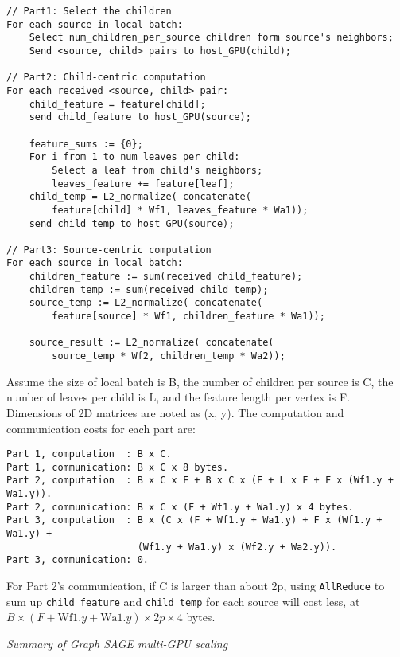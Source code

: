 \documentclass[10pt,oneside]{memoir}
\begin{document}
\begin{verbatim}
// Part1: Select the children
For each source in local batch:
    Select num_children_per_source children form source's neighbors;
    Send <source, child> pairs to host_GPU(child);

// Part2: Child-centric computation
For each received <source, child> pair:
    child_feature = feature[child];
    send child_feature to host_GPU(source);

    feature_sums := {0};
    For i from 1 to num_leaves_per_child:
        Select a leaf from child's neighbors;
        leaves_feature += feature[leaf];
    child_temp = L2_normalize( concatenate(
        feature[child] * Wf1, leaves_feature * Wa1));
    send child_temp to host_GPU(source);

// Part3: Source-centric computation
For each source in local batch:
    children_feature := sum(received child_feature);
    children_temp := sum(received child_temp);
    source_temp := L2_normalize( concatenate(
        feature[source] * Wf1, children_feature * Wa1));

    source_result := L2_normalize( concatenate(
        source_temp * Wf2, children_temp * Wa2));
\end{verbatim}

Assume the size of local batch is B, the number of children per source
is C, the number of leaves per child is L, and the feature length per
vertex is F. Dimensions of 2D matrices are noted as (x, y). The
computation and communication costs for each part are:

\begin{verbatim}
Part 1, computation  : B x C.
Part 1, communication: B x C x 8 bytes.
Part 2, computation  : B x C x F + B x C x (F + L x F + F x (Wf1.y + Wa1.y)).
Part 2, communication: B x C x (F + Wf1.y + Wa1.y) x 4 bytes.
Part 3, computation  : B x (C x (F + Wf1.y + Wa1.y) + F x (Wf1.y + Wa1.y) +
                       (Wf1.y + Wa1.y) x (Wf2.y + Wa2.y)).
Part 3, communication: 0.
\end{verbatim}

For Part 2's communication, if C is larger than about 2p, using
\texttt{AllReduce} to sum up \texttt{child\_feature} and
\texttt{child\_temp} for each source will cost less, at
\(B \times (F + \textrm{Wf1}.y + \textrm{Wa1}.y) \times 2p \times 4\)
bytes.

\emph{Summary of Graph SAGE multi-GPU scaling}
\end{document}
